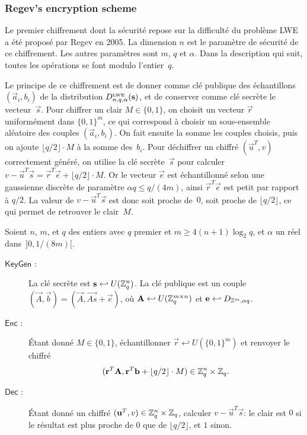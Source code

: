 \subsubsection{Regev's encryption scheme}

Le premier chiffrement dont la sécurité repose sur la difficulté du problème LWE a été proposé par Regev en 2005. La dimension $n$ est le paramètre de sécurité de ce chiffrement. Les autres paramètres sont $m$, $q$ et $\alpha$. Dans la description qui suit, toutes les opérations se font modulo l'entier~$q$.

Le principe de ce chiffrement est de donner comme clé publique des échantillons $(\vec{a}_i,b_i)$ de la distribution $D_{n,q,\alpha}^{\mbox{\tiny LWE}}(\vec{s})$, et de conserver comme clé secrète le vecteur~$\vec{s}$.
Pour chiffrer un clair $M \in \{0,1 \}$, on choisit un vecteur $\vec{r}$ uniformément dans $\{0,1 \}^m$, 
ce qui correspond à choisir un sous-ensemble aléatoire des couples $(\vec{a}_i,b_i)$. 
On fait ensuite la somme les couples choisis, puis on ajoute $\lfloor q/2 \rfloor \cdot M$ à la somme des~$b_i$.
Pour déchiffrer un chiffré $(\vec{u}^T,v)$ correctement généré, on utilise la clé secrète~$\vec{s}$ pour 
calculer $v - \vec{u}^T \vec{s} =  \vec{r}^T \vec{e} + \lfloor q/2 \rfloor \cdot M $. Or le vecteur $\vec{e}$ est échantillonné selon une gaussienne discrète de paramètre 
$\alpha q \leq q/(4m)$, ainsi $\vec{r}^T \vec{e}$ est petit par rapport à $q/2$.
La valeur de $v - \vec{u}^T \vec{s}$ est donc soit proche de~$0$, soit proche de $\lfloor q/2 \rfloor$, ce qui permet de 
retrouver le clair~$M$.


\begin{definition} 
Soient $n$, $m$, et $q$ des entiers avec $q$ premier et $m \geq 4 (n+1) \log_2 q$, 
et $\alpha$ un réel dans~$]0,1/(8m)[$.

\begin{description}
\item[$\mathsf{KeyGen}$ :]
La clé secrète est $\vec{s} \hookleftarrow U (\mZ_q^n)$. La clé publique est un couple $(\vec{A}, \vec{b}) = (\vec{A}, \vec{As} + \vec{e})$, où $\vec{A} \hookleftarrow U (\mZ_q^{m \times n})$ et 
$\vec{e} \hookleftarrow D_{\mZ^m, \alpha q}$. 

\item[$\mathsf{Enc}$ :]
\'Etant donné $M \in \{0,1 \}$, échantillonner $\vec{r} \hookleftarrow U(\{0,1 \}^m)$ et renvoyer le chiffré $$( \vec{r}^T \vec{A}, \vec{r}^T \vec{b} + \lfloor q/2 \rfloor \cdot M)
\in \mZ_q^{n} \times \mZ_q.$$

\item[$\mathsf{Dec} $ :] 
\'Etant donné un chiffré $(\vec{u}^T,v) \in \mZ_q^{n} \times \mZ_q$, calculer $v - \vec{u}^T \vec{s}$: le clair est $0$ si le résultat est plus proche de $0$ que de $\lfloor q/2 \rfloor$, 
et $1$ sinon.
\end{description}
\end{definition}


